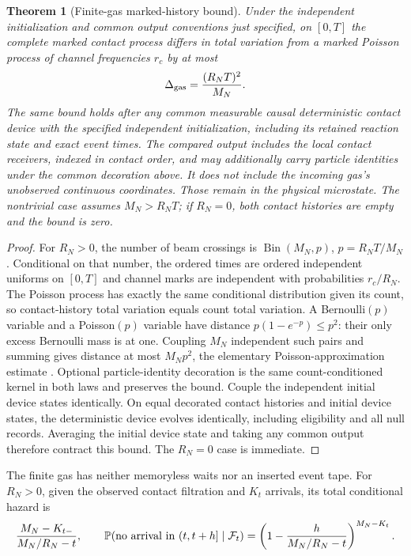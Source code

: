 \documentclass[11pt]{article}
\newtheorem{theorem}{Theorem}[section]
\theoremstyle{definition}\newtheorem{definition}[theorem]{Definition}
\theoremstyle{remark}\newtheorem{remark}[theorem]{Remark}
\begin{document}
\begin{theorem}[Finite-gas marked-history bound]\label{thm:gas}
Under the independent initialization and common output conventions just specified, on $[0,T]$ the complete marked contact process differs in total variation from a marked Poisson process of channel frequencies $r_c$ by at most
\begin{equation}
 \Delta_{\rm gas}=\frac{(R_NT)^2}{M_N}.
 \label{eq:gaserror}
\end{equation}
The same bound holds after any common measurable causal deterministic contact device with the specified independent initialization, including its retained reaction state and exact event times. The compared output includes the local contact receivers, indexed in contact order, and may additionally carry particle identities under the common decoration above. It does not include the incoming gas's unobserved continuous coordinates. Those remain in the physical microstate. The nontrivial case assumes $M_N>R_NT$; if $R_N=0$, both contact histories are empty and the bound is zero.
\end{theorem}
\begin{proof}
For $R_N>0$, the number of beam crossings is $\operatorname{Bin}(M_N,p)$, $p=R_NT/M_N$. Conditional on that number, the ordered times are ordered independent uniforms on $[0,T]$ and channel marks are independent with probabilities $r_c/R_N$. The Poisson process has exactly the same conditional distribution given its count, so contact-history total variation equals count total variation. A Bernoulli$(p)$ variable and a Poisson$(p)$ variable have distance $p(1-e^{-p})\le p^2$: their only excess Bernoulli mass is at one. Coupling $M_N$ independent such pairs and summing gives distance at most $M_Np^2$, the elementary Poisson-approximation estimate \cite{LeCam1960}. Optional particle-identity decoration is the same count-conditioned kernel in both laws and preserves the bound. Couple the independent initial device states identically. On equal decorated contact histories and initial device states, the deterministic device evolves identically, including eligibility and all null records. Averaging the initial device state and taking any common output therefore contract this bound. The $R_N=0$ case is immediate.
\end{proof}
The finite gas has neither memoryless waits nor an inserted event tape. For $R_N>0$, given the observed contact filtration and $K_t$ arrivals, its total conditional hazard is
\[
 \frac{M_N-K_{t-}}{M_N/R_N-t},
 \qquad
 \mathbb P(\text{no arrival in }(t,t+h]\mid\mathcal F_t)
  =\left(1-\frac{h}{M_N/R_N-t}\right)^{M_N-K_t}.
\]
\end{document}
